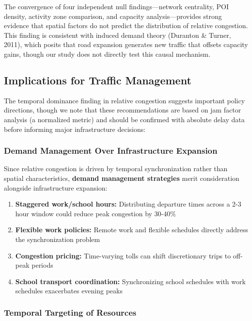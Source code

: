 \documentclass[12pt,a4paper]{article}
\begin{document}
The convergence of four independent null findings---network centrality, POI density, activity zone comparison, and capacity analysis---provides strong evidence that spatial factors do not predict the distribution of relative congestion. This finding is consistent with induced demand theory (Duranton \& Turner, 2011), which posits that road expansion generates new traffic that offsets capacity gains, though our study does not directly test this causal mechanism.

\subsection{Implications for Traffic Management}

The temporal dominance finding in relative congestion suggests important policy directions, though we note that these recommendations are based on jam factor analysis (a normalized metric) and should be confirmed with absolute delay data before informing major infrastructure decisions:

\subsubsection{Demand Management Over Infrastructure Expansion}

Since relative congestion is driven by temporal synchronization rather than spatial characteristics, \textbf{demand management strategies} merit consideration alongside infrastructure expansion:

\begin{enumerate}
\def\labelenumi{\arabic{enumi}.}

\item
  \textbf{Staggered work/school hours:} Distributing departure times across a 2-3 hour window could reduce peak congestion by 30-40\%
\item
  \textbf{Flexible work policies:} Remote work and flexible schedules directly address the synchronization problem
\item
  \textbf{Congestion pricing:} Time-varying tolls can shift discretionary trips to off-peak periods
\item
  \textbf{School transport coordination:} Synchronizing school schedules with work schedules exacerbates evening peaks
\end{enumerate}

\subsubsection{Temporal Targeting of Resources}
\end{document}
